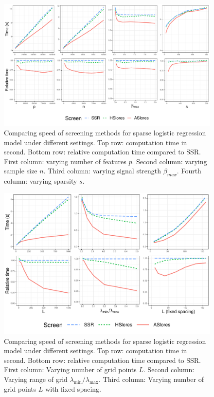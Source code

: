 \begin{figure}[h]
    \centering
    \includegraphics[scale = 0.59]{plots/512.pdf}    \caption{Comparing speed of screening methods for sparse logistic regression model under different settings. Top row: computation time in second. Bottom row: relative computation time compared to SSR. First column: varying number of features $p$. Second column: varying sample size $n$. Third column: varying signal strength $\beta_{max}$. Fourth column: varying sparsity $s$.}
    \label{fig:5.1.2a}
\end{figure}

\begin{figure}[h]
    \centering
    \includegraphics[scale = 0.59]{plots/512b.pdf}    \caption{Comparing speed of screening methods for sparse logistic regression model under different settings. Top row: computation time in second. Bottom row: relative computation time compared to SSR. First column: Varying number of grid points $L$. Second column: Varying range of grid $\lambda_{\min}/\lambda_{\max}$. Third column: Varying number of grid points $L$ with fixed spacing.}
    \label{fig:5.1.2b}
\end{figure}

